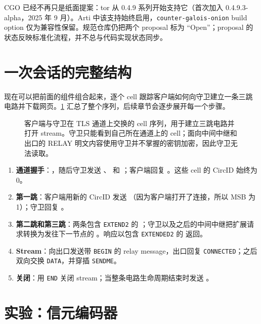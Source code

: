 CGO 已经不再只是纸面提案：tor 从 0.4.9 系列开始支持它（首次加入 0.4.9.3-alpha，2025 年 9 月）。Arti 中该支持始终启用，\texttt{counter-galois-onion} build option 仅为兼容性保留。规范仓库仍把两个 proposal 标为 \enquote{Open}；proposal 的状态反映标准化流程，并不总与代码实现状态同步。

\section{一次会话的完整结构}\label{sec:sessione}

现在可以把前面的组件组合起来，逐个 cell 跟踪客户端如何向守卫建立一条三跳电路并下载网页。\cref{fig:sessione} 汇总了整个序列，后续章节会逐步展开每一个步骤。

\begin{figure}[htbp]
\centering

\caption{客户端与守卫在 TLS 通道上交换的 cell 序列，用于建立三跳电路并打开 stream。守卫只能看到自己所在通道上的 cell；面向中间中继和出口的 RELAY 明文内容使用守卫并不掌握的密钥加密，因此守卫无法读取。}
\label{fig:sessione}
\end{figure}

\begin{enumerate}
  \item \textbf{通道握手}：，随后守卫发送 、 和 ；客户端回复 。这些 cell 的 CircID 始终为 0。
  \item \textbf{第一跳}：客户端用新的 CircID 发送 （因为客户端打开了连接，所以 MSB 为 1）；守卫回复 。
  \item \textbf{第二跳和第三跳}：两条包含 \texttt{EXTEND2} 的 ；守卫以及之后的中间中继把扩展请求转换为发往下一节点的 。响应以包含 \texttt{EXTENDED2} 的  返回。
  \item \textbf{Stream}：向出口发送带 \texttt{BEGIN} 的 relay message，出口回复 \texttt{CONNECTED}；之后双向交换 \texttt{DATA}，并穿插 \texttt{SENDME}。
  \item \textbf{关闭}：用 \texttt{END} 关闭 stream；当整条电路生命周期结束时发送 。
\end{enumerate}

\section{实验：信元编码器}\label{sec:lab-celle}

